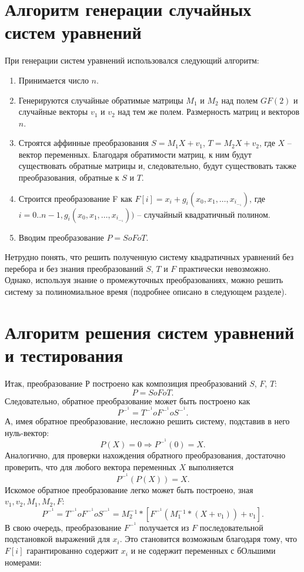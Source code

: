 \section{Алгоритм генерации случайных систем уравнений}

При генерации систем уравнений использовался следующий алгоритм:
\begin{enumerate}
	\item Принимается число \(n\).
	\item Генерируются случайные обратимые матрицы \(M_1\) и \(M_2\) над полем \(GF(2)\) и случайные векторы \(v_1\) и \(v_2\) над тем же полем. Размерность матриц и векторов \(n\).
	\item Строятся аффинные преобразования \(S=M_1X+v_1\), \(T=M_2X+v_2\), где \(X\) – вектор переменных. Благодаря обратимости матриц, к ним будут существовать обратные матрицы и, следовательно, будут существовать также преобразования, обратные к \(S\) и \(T\).
	\item Строится преобразование F как \(F[i]=x_i+g_i(x_0,x_1,…,x_i_-_1)\), где  \(i=0..n-1,g_i(x_0,x_1,…,x_i_-_1))\) – случайный квадратичный полином.
	\item Вводим преобразование \(P= SoFoT\).
\end{enumerate} 

Нетрудно понять, что решить полученную систему квадратичных уравнений без перебора и без знания преобразований \(S\), \(T\) и \(F\) практически невозможно. Однако, используя знание о промежуточных преобразованиях, можно решить систему за полиномиальное время (подробнее описано в следующем разделе). 


\section{Алгоритм решения систем уравнений и тестирования}
Итак, преобразование \(Р\) построено как композиция преобразований \(S\), \(F\), \(T\):
\begin{equation}P=SoFoT.\end{equation}
Следовательно, обратное преобразование может быть построено как
\begin{equation}P^-^1=T^-^1oF^-^1oS^-^1.\end{equation}
А, имея обратное преобразование, несложно решить систему, подставив в него нуль-вектор:
\begin{equation}P(X)=0\Rightarrow P^-^1(0)=X.\end{equation}
Аналогично, для проверки нахождения обратного преобразования, достаточно проверить, что для любого вектора переменных \(X\) выполняется
\begin{equation}P^-^1(P(X))=X.\end{equation}
Искомое обратное преобразование легко может быть построено, зная \(v_1,v_2,M_1,M_2,F\):
\begin{equation}P^-^1=T^-^1oF^-^1oS^-^1= M_2^-^1*[F^-^1 (M_1^-^1*(X+v_1 ))+v_1].\end{equation}
В свою очередь, преобразование \(F^-^1\) получается из \(F\) последовательной подстановкой выражений для \(x_i\). Это становится возможным благодаря тому, что \(F[i]\) гарантированно содержит \(x_i\) и не содержит переменных с бОльшими номерами:

